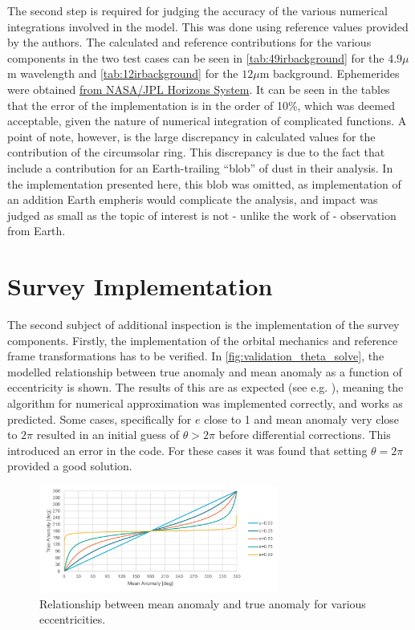 The second step is required for judging the accuracy of the various numerical integrations involved in the model. This was done using reference values provided by the authors. The calculated and reference contributions for the various components in the two test cases can be seen in \autoref{tab:49irbackground} for the $4.9 \mu$m wavelength and \autoref{tab:12irbackground} for the $12 \mu$m background. Ephemerides were obtained \href{https://ssd.jpl.nasa.gov/horizons/}{from NASA/JPL Horizons System}. It can be seen in the tables that the error of the implementation is in the order of 10\%, which was deemed acceptable, given the nature of numerical integration of complicated functions. A point of note, however, is the large discrepancy in calculated values for the contribution of the circumsolar ring. This discrepancy is due to the fact that \cite{IRDust} include a contribution for an Earth-trailing ``blob'' of dust in their analysis. In the implementation presented here, this blob was omitted, as implementation of an addition Earth empheris would complicate the analysis, and impact was judged as small as the topic of interest is not - unlike the work of \cite{IRDust} - observation from Earth.

\section{Survey Implementation}
\label{sec:vvsurvey}
The second subject of additional inspection is the implementation of the survey components. Firstly, the implementation of the orbital mechanics and reference frame transformations has to be verified. In \autoref{fig:validation_theta_solve}, the modelled relationship between true anomaly and mean anomaly as a function of eccentricity is shown. The results of this are as expected (see e.g. \cite{Curtis}), meaning the algorithm for numerical approximation was implemented correctly, and works as predicted. Some cases, specifically for $e$ close to 1 and mean anomaly very close to $2\pi$ resulted in an initial guess of $\theta > 2\pi$ before differential corrections. This introduced an error in the code. For these cases it was found that setting $\theta = 2\pi$ provided a good solution. \\

\begin{figure}[htbp]
 \centering
 \includegraphics[width=0.7\textwidth]{img/validation_theta_solve.pdf}
 \caption{Relationship between mean anomaly and true anomaly for various eccentricities.}
 \label{fig:validation_theta_solve}
\end{figure}

